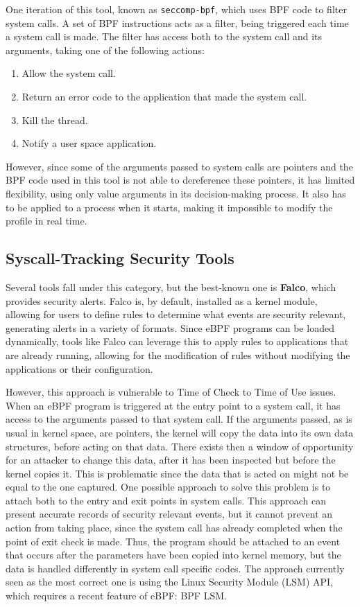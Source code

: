 One iteration of this tool, known as \texttt{seccomp-bpf}, which uses BPF code to filter system calls. A set of BPF instructions acts as a filter, being triggered each time a system call is made. The filter has access both to the system call and its arguments, taking one of the following actions: 

\begin{enumerate}
    \item Allow the system call. 
    \item Return an error code to the application that made the system call. 
    \item Kill the thread. 
    \item Notify a user space application.
\end{enumerate}

However, since some of the arguments passed to system calls are pointers and the BPF code used in this tool is not able to dereference these pointers, it has limited flexibility, using only value arguments in its decision-making process. It also has to be applied to a process when it starts, making it impossible to modify the profile in real time. 

\subsection{Syscall-Tracking Security Tools}

Several tools fall under this category, but the best-known one is \textbf{Falco}, which provides security alerts. Falco is, by default, installed as a kernel module, allowing for users to define rules to determine what events are security relevant, generating alerts in a variety of formats. Since eBPF programs can be loaded dynamically, tools like Falco can leverage this to apply rules to applications that are already running, allowing for the modification of rules without modifying the applications or their configuration. 

However, this approach is vulnerable to Time of Check to Time of Use issues. 
When an eBPF program is triggered at the entry point to a system call, it has access to the arguments passed to that system call. If the arguments passed, as is usual in kernel space, are pointers, the kernel will copy the data into its own data structures, before acting on that data. There exists then a window of opportunity for an attacker to change this data, after it has been inspected but before the kernel copies it. This is problematic since the data that is acted on might not be equal to the one captured. One possible approach to solve this problem is to attach both to the entry and exit points in system calls. This approach can present accurate records of security relevant events, but it cannot prevent an action from taking place, since the system call has already completed when the point of exit check is made. Thus, the program should be attached to an event that occurs after the parameters have been copied into kernel memory, but the data is handled differently in system call specific codes. The approach currently seen as the most correct one is using the Linux Security Module (LSM) API, which requires a recent feature of eBPF: BPF LSM. 

